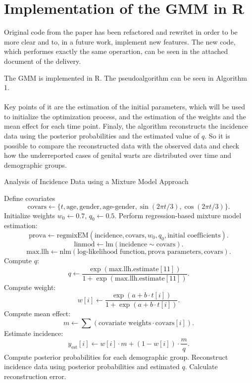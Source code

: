 \documentclass[acmsmall, nonacm]{acmart}
\begin{document}
\section*{Implementation of the GMM in R}
Original code from the paper has been refactored and rewritet in order to be more clear and to, in a future work, implement new features. The new code, which performes exactly the same operartion, can be seen in the attached document of the delivery.

The GMM is implemented in R. The pseudoalgorithm can be seen in Algorithm 1.
\\\\
Key points of it are the estimation of the initial parameters, which will be used to initialize the optimization process, and the estimation of the weights and the mean effect for each time point. Finaly, the algorithm reconstructs the incidence data using the posterior probabilities and the estimated value of $q$. So it is possible to compare the reconstructed data with the observed data and check how the underreported cases of genital warts are distributed over time and demographic groups.
\begin{algorithm}
    \label{al:1}
    \caption{Analysis of Incidence Data using a Mixture Model Approach}
    \begin{algorithmic}[1]
     Define covariates
    \[
    \text{covars} \gets \{t, \text{age}, \text{gender}, \text{age-gender}, \sin(2\pi t / 3), \cos(2\pi t / 3)\}.
    \]
    \STATE Initialize weights $w_0 \gets 0.7$, $q_0 \gets 0.5$.
    \STATE Perform regression-based mixture model estimation:
    \[
    \text{prova} \gets \text{regmixEM}(\text{incidence}, \text{covars}, w_0, q_0, \text{initial coefficients}).
    \]
    \[
    \text{linmod} \gets \text{lm}(\text{incidence} \sim \text{covars}).
    \]
    \[
    \text{max.llh} \gets \text{nlm}(\text{log-likelihood function}, \text{prova parameters}, \text{covars}).
    \]
    \STATE Compute $q$:
    \[
    q \gets \frac{\exp(\text{max.llh.estimate}[11])}{1 + \exp(\text{max.llh.estimate}[11])}.
    \]
        \STATE Compute weight:
        \[
        w[i] \gets \frac{\exp(a + b \cdot t[i])}{1 + \exp(a + b \cdot t[i])}.
        \]
        \STATE Compute mean effect:
        \[
        m \gets \sum (\text{covariate weights} \cdot \text{covars}[i]).
        \]
        \STATE Estimate incidence:
        \[
        y_\text{est}[i] \gets w[i] \cdot m + (1 - w[i]) \cdot \frac{m}{q}.
        \]
    \ENDFOR
     Compute posterior probabilities for each demographic group.
     Reconstruct incidence data using posterior probabilities and estimated $q$.
    \STATE Calculate reconstruction error.
    \end{algorithmic}
\end{algorithm}
\newpage
\end{document}
